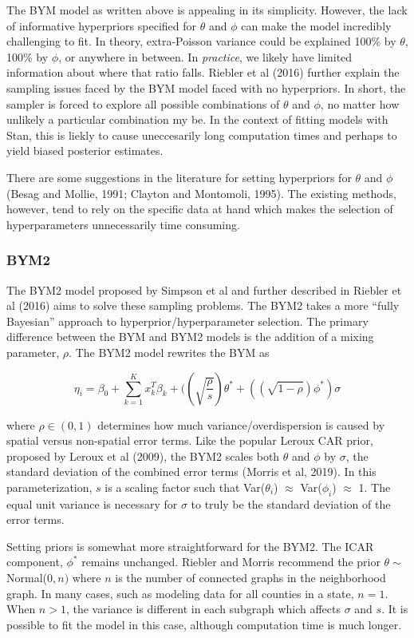 \documentclass[]{article}
\begin{document}
The BYM model as written above is appealing in its simplicity. However,
the lack of informative hyperpriors specified for \(\theta\) and
\(\phi\) can make the model incredibly challenging to fit. In theory,
extra-Poisson variance could be explained 100\% by \(\theta\), 100\% by
\(\phi\), or anywhere in between. In \emph{practice}, we likely have
limited information about where that ratio falls. Riebler et al (2016)
further explain the sampling issues faced by the BYM model faced with no
hyperpriors. In short, the sampler is forced to explore all possible
combinations of \(\theta\) and \(\phi\), no matter how unlikely a
particular combination my be. In the context of fitting models with
Stan, this is liekly to cause uneccesarily long computation times and
perhaps to yield biased posterior estimates.

There are some suggestions in the literature for setting hyperpriors for
\(\theta\) and \(\phi\) (Besag and Mollie, 1991; Clayton and Montomoli,
1995). The existing methods, however, tend to rely on the specific data
at hand which makes the selection of hyperparameters unnecessarily time
consuming.

\subsubsection{BYM2}\label{bym2}

The BYM2 model proposed by Simpson et al and further described in
Riebler et al (2016) aims to solve these sampling problems. The BYM2
takes a more ``fully Bayesian'' approach to hyperprior/hyperparameter
selection. The primary difference between the BYM and BYM2 models is the
addition of a mixing parameter, \(\rho\). The BYM2 model rewrites the
BYM as

\[
\eta_i = \beta_0 + \sum_{k=1}^{K}x_k^T\beta_k + ((\sqrt{\frac{\rho}{s}})\theta^{*} + ((\sqrt{1-\rho})\phi^{*})\sigma
\]

where \(\rho \in (0, 1)\) determines how much variance/overdispersion is
caused by spatial versus non-spatial error terms. Like the popular
Leroux CAR prior, proposed by Leroux et al (2009), the BYM2 scales both
\(\theta\) and \(\phi\) by \(\sigma\), the standard deviation of the
combined error terms (Morris et al, 2019). In this parameterization,
\(s\) is a scaling factor such that Var(\(\theta_i\)) \(\approx\)
Var(\(\phi_i\)) \(\approx\) 1. The equal unit variance is necessary for
\(\sigma\) to truly be the standard deviation of the error terms.

Setting priors is somewhat more straightforward for the BYM2. The ICAR
component, \(\phi^{*}\) remains unchanged. Riebler and Morris recommend
the prior \(\theta \sim\) Normal(\(0, n)\) where \(n\) is the number of
connected graphs in the neighborhood graph. In many cases, such as
modeling data for all counties in a state, \(n=1\). When \(n>1\), the
variance is different in each subgraph which affects \(\sigma\) and
\(s\). It is possible to fit the model in this case, although
computation time is much longer.
\end{document}
